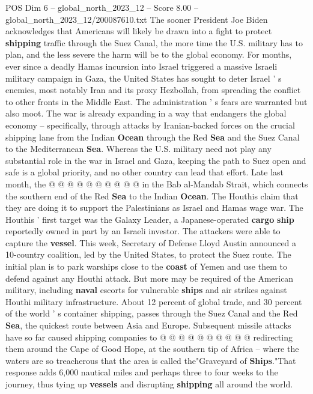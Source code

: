 \begin{textsample}{POS Dim 6 – global\_north\_2023\_12 – Score 8.00 – global\_north\_2023\_12/200087610.txt}  \label{ex:f6_pos_186}
The sooner President Joe Biden acknowledges that Americans will likely be drawn into a fight to protect \textbf{shipping} traffic through the Suez Canal, the more time the U.S. military has to plan, and the less severe the harm will be to the global economy.
For months, ever since a deadly Hamas incursion into Israel triggered a massive Israeli military campaign in Gaza, the United States has sought to deter Israel ' s enemies, most notably Iran and its proxy Hezbollah, from spreading the conflict to other fronts in the Middle East.
The administration ' s fears are warranted but also moot.
The war is already expanding in a way that endangers the global economy -- specifically, through attacks by Iranian-backed forces on the crucial shipping lane from the Indian \textbf{Ocean} through the Red \textbf{Sea} and the Suez Canal to the Mediterranean \textbf{Sea}.
Whereas the U.S. military need not play any substantial role in the war in Israel and Gaza, keeping the path to Suez open and safe is a global priority, and no other country can lead that effort.
Late last month, the @ @ @ @ @ @ @ @ @ @ in the Bab al-Mandab Strait, which connects the southern end of the Red \textbf{Sea} to the Indian \textbf{Ocean}.
The Houthis claim that they are doing it to support the Palestinians as Israel and Hamas wage war.
The Houthis ' first target was the Galaxy Leader, a Japanese-operated \textbf{cargo} \textbf{ship} reportedly owned in part by an Israeli investor.
The attackers were able to capture the \textbf{vessel}.
This week, Secretary of Defense Lloyd Austin announced a 10-country coalition, led by the United States, to protect the Suez route.
The initial plan is to park warships close to the \textbf{coast} of Yemen and use them to defend against any Houthi attack.
But more may be required of the American military, including \textbf{naval} escorts for vulnerable \textbf{ships} and air strikes against Houthi military infrastructure.
About 12 percent of global trade, and 30 percent of the world ' s container shipping, passes through the Suez Canal and the Red \textbf{Sea}, the quickest route between Asia and Europe.
Subsequent missile attacks have so far caused shipping companies to @ @ @ @ @ @ @ @ @ @ redirecting them around the Cape of Good Hope, at the southern tip of Africa -- where the waters are so treacherous that the area is called the"Graveyard of \textbf{Ships}."That response adds 6,000 nautical miles and perhaps three to four weeks to the journey, thus tying up \textbf{vessels} and disrupting \textbf{shipping} all around the world.

\end{textsample}
